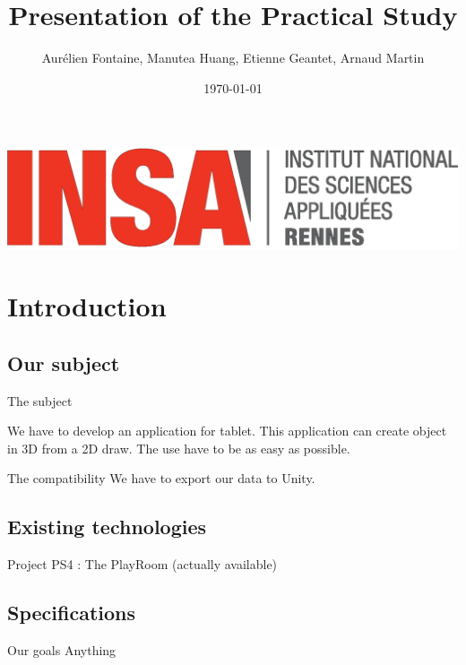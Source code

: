 \documentclass[a4paper,10pt]{beamer}
\title{Presentation of the Practical Study}
\author[Groupe 3INFO]{Aurélien Fontaine, Manutea Huang, Etienne Geantet, Arnaud Martin}
\institute[INSA de Rennes]{Institut National des Sciences Appliquées de Rennes}
\date{\today}
\begin{document}
	\begin{frame}
		\begin{titlepage}
			\centerline{\includegraphics[scale=0.1]{logoINSA.jpg}}
		\end{titlepage}
	\end{frame}
	
	\begin{frame}
		\tableofcontents
	\end{frame}
	
	\section{Introduction}
	
		\subsection{Our subject}
	
			\begin{frame}{The subject}
				
				We have to develop an application for tablet. This application can create object in 3D from a 2D draw. The use have to be as easy as possible.
				
				\begin{block}{The compatibility}
					We have to export our data to Unity.
				\end{block}
			\end{frame}
			
		\subsection{Existing technologies}
			
			\begin{frame}{}
				Project PS4 : The PlayRoom (actually available)
			\end{frame}
		
		\subsection{Specifications}
		
			\begin{frame}{Our goals}
				Anything
			\end{frame}
	
\end{document}
